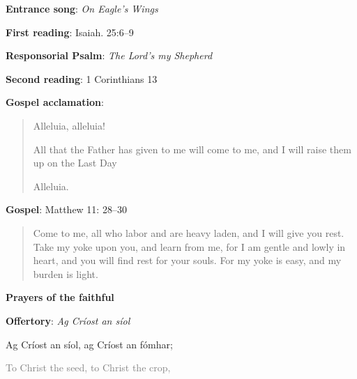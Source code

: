 \documentclass[14pt,landscape]{extarticle}
\begin{document}
\raggedcolumns
\begin{multicols}{2} \columnbreak



{\bf Entrance song}: {\em On Eagle's Wings}

\vspace{1em}

{\bf First reading}: Isaiah. 25:6--9

\vspace{1em}

{\bf Responsorial Psalm}: {\em The Lord's my Shepherd}

\vspace{1em}

{\bf Second reading}: 1 Corinthians 13

\vspace{1em}

{\bf Gospel acclamation}: 

\begin{quote}
Alleluia, alleluia!

All that the Father has given to me will come to me, and I will raise them up
on the Last Day

Alleluia.
\end{quote}

\vspace{1em}

{\bf Gospel}: Matthew 11: 28--30

\begin{quote}
Come to me, all who labor and are heavy laden, and I will give you rest. 
Take my yoke upon you, and learn from me, for I am gentle and lowly in heart,
and you will find rest for your souls. For my yoke is easy, and my burden is
light.
\end{quote}

\vspace{1em}

{\bf Prayers of the faithful}

\vspace{1em}


{\bf Offertory}: {\em Ag Cr\'iost an s\'iol}

\vspace{1em}

\hspace{1em} Ag Cr\'iost an s\'iol, ag Cr\'iost an f\'omhar;

\hspace{2em} \textcolor{gray}{\small To Christ the seed, to Christ the crop,}


\end{multicols}
\end{document}
